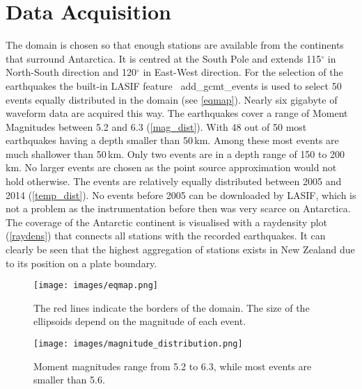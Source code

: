 
\chapter{Data Acquisition}

The domain is chosen so that enough stations are available from the continents that surround Antarctica.
It is centred at the South Pole and extends 115$^\circ$ in North-South direction and 120$^\circ$ in
East-West direction. 
For the selection of the earthquakes the built-in LASIF feature \
add\_gcmt\_events is used to select 50 events equally distributed in the
domain (see \autoref{eqmap}). Nearly six gigabyte of waveform data are acquired this way.
The earthquakes cover a range of Moment Magnitudes between 5.2 and 6.3 (\autoref{mag_dist}). 
With 48 out of 50 most earthquakes having a depth smaller than 50\,km. Among these most 
events are much shallower than 50\,km. Only two events are in a depth range of 150 to 200\,km. 
No larger events are chosen as the point source approximation would not hold otherwise. 
The events are relatively equally distributed between 2005 and 2014 (\autoref{temp_dist}). No events before 2005 can 
be downloaded by LASIF, which is not a problem as the instrumentation before then was very scarce on Antarctica. 
The coverage of the Antarctic continent is visualised with a raydensity plot (\autoref{raydens}) that connects all 
stations with the recorded earthquakes. It can clearly be seen that the highest aggregation of stations exists in 
New Zealand due to its position on a plate boundary. \\


\begin{figure}[H]
\begin{center}
\texttt{[image: images/eqmap.png]}
\caption{The red lines indicate the borders of the domain. The size of the ellipsoids depend on the magnitude of each event.}
\label{eqmap}
\end{center}
\end{figure}

\begin{figure}[H]
\begin{center}
\texttt{[image: images/magnitude\_distribution.png]}
\caption{Moment magnitudes range from 5.2 to 6.3, while most events are smaller than 5.6.}
\label{mag_dist}
\end{center}
\end{figure}

